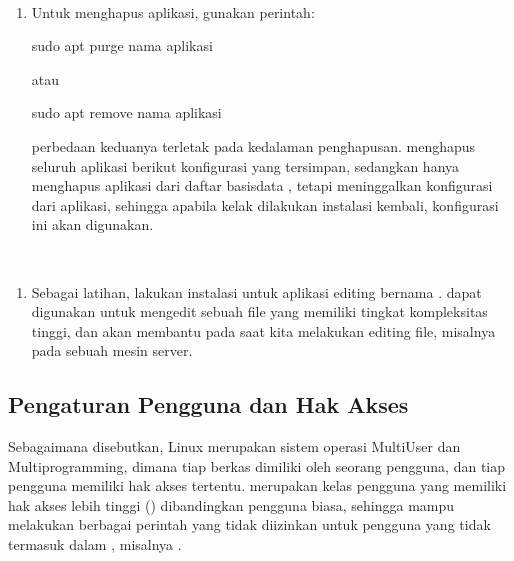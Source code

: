 \documentclass[letterpaper,10pt,english]{sphinxmanual}
\begin{document}
 
\begin{enumerate}
%
\item {} 
Untuk menghapus aplikasi, gunakan perintah:

\begin{sphinxVerbatim}[commandchars=\\\{\}]
sudo apt purge \PYGZlt{}nama aplikasi\PYGZgt{}
\end{sphinxVerbatim}

atau

\begin{sphinxVerbatim}[commandchars=\\\{\}]
sudo apt remove \PYGZlt{}nama aplikasi\PYGZgt{}
\end{sphinxVerbatim}

perbedaan keduanya terletak pada kedalaman penghapusan.  menghapus seluruh aplikasi berikut konfigurasi yang tersimpan, sedangkan  hanya menghapus aplikasi dari daftar basisdata , tetapi meninggalkan konfigurasi dari aplikasi, sehingga apabila kelak dilakukan instalasi kembali, konfigurasi ini akan digunakan.

\end{enumerate}

 
\begin{enumerate}
%
\item {} 
Sebagai latihan, lakukan instalasi untuk aplikasi editing bernama .  dapat digunakan untuk mengedit sebuah file yang memiliki tingkat kompleksitas tinggi, dan akan membantu pada saat kita melakukan editing file, misalnya pada sebuah mesin server.

\end{enumerate}


\subsection{Pengaturan Pengguna dan Hak Akses}
\label{\detokenize{sesi1/arsitektur:pengaturan-pengguna-dan-hak-akses}}
Sebagaimana disebutkan, Linux merupakan sistem operasi MultiUser dan Multiprogramming, dimana tiap berkas dimiliki oleh seorang pengguna, dan tiap pengguna memiliki hak akses tertentu.  merupakan kelas pengguna yang memiliki hak akses lebih tinggi () dibandingkan pengguna biasa, sehingga mampu melakukan berbagai perintah yang tidak diizinkan untuk pengguna yang tidak termasuk dalam , misalnya .
\end{document}
